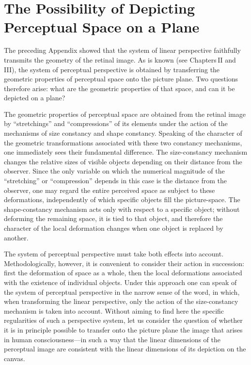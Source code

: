 
\chapter{The Possibility of Depicting Perceptual Space on a Plane}


The preceding Appendix showed that the system of linear perspective faithfully transmits the
geometry of the retinal image.  As is known (see Chapters\,II and\,III), the system of
perceptual perspective is obtained by transferring the geometric properties of perceptual
space onto the picture plane.  Two questions therefore arise: what are the geometric
properties of that space, and can it be depicted on a plane?

The geometric properties of perceptual space are obtained from the retinal image by
``stretchings'' and ``compressions'' of its elements under the action of the mechanisms of
size constancy and shape constancy.  Speaking of the character of the geometric
transformations associated with these two constancy mechanisms, one immediately sees
their fundamental difference.  The size-constancy mechanism changes the relative sizes of
visible objects depending on their distance from the observer.  Since the only variable on
which the numerical magnitude of the ``stretching'' or ``compression'' depends in this case
is the distance from the observer, one may regard the entire perceived space as subject to
these deformations, independently of which specific objects fill the picture-space.  The
shape-constancy mechanism acts only with respect to a specific object; without deforming
the remaining space, it is tied to that object, and therefore the character of the local
deformation changes when one object is replaced by another.

The system of perceptual perspective must take both effects into account.  Methodologically,
however, it is convenient to consider their action in succession: first the deformation of space
as a whole, then the local deformations associated with the existence of individual objects.
Under this approach one can speak of the system of perceptual perspective in the narrow
sense of the word, in which, when transforming the linear perspective, only the action of the
size-constancy mechanism is taken into account.  Without aiming to find here the specific
regularities of such a perspective system, let us consider the question of whether it is in
principle possible to transfer onto the picture plane the image that arises in human
consciousness---in such a way that the linear dimensions of the perceptual image are
consistent with the linear dimensions of its depiction on the canvas.

